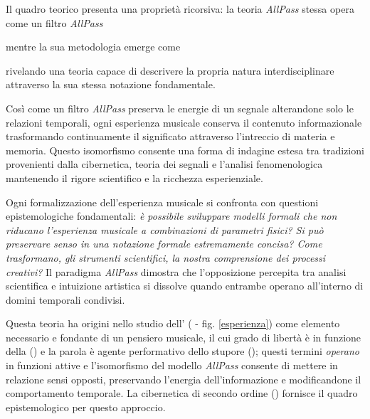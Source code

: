 Il quadro teorico presenta una proprietà ricorsiva: la teoria \emph{AllPass} stessa opera come un filtro \emph{AllPass}


\noindent mentre la sua metodologia emerge come


rivelando una teoria capace di descrivere la propria natura interdisciplinare attraverso la sua stessa notazione fondamentale.

Così come un filtro \emph{AllPass} preserva le energie di un segnale alterandone solo le relazioni temporali, ogni esperienza musicale conserva il contenuto informazionale trasformando continuamente il significato attraverso l'intreccio di materia e memoria. Questo isomorfismo consente una forma di indagine estesa tra tradizioni provenienti dalla cibernetica, teoria dei segnali e l'analisi fenomenologica mantenendo il rigore scientifico e la ricchezza esperienziale.

Ogni formalizzazione dell'esperienza musicale si confronta con questioni epistemologiche fondamentali: \textit{è possibile sviluppare modelli formali che non riducano l'esperienza musicale a combinazioni di parametri fisici? Si può preservare senso in una notazione formale estremamente concisa? Come trasformano, gli strumenti scientifici, la nostra comprensione dei processi creativi?} Il paradigma \emph{AllPass} dimostra che l'opposizione percepita tra analisi scientifica e intuizione artistica si dissolve quando entrambe operano all'interno di domini temporali condivisi.

Questa teoria ha origini nello studio dell' (\cite{bergson1896} - fig. \ref{esperienza}) come elemento necessario e fondante di un pensiero musicale, il cui grado di libertà è in funzione della  (\cite{agamben17}) e la parola è agente performativo dello stupore (\cite{ronchi2001}); questi termini \emph{operano} in funzioni attive e l'isomorfismo del modello \emph{AllPass} consente di mettere in relazione sensi opposti, preservando l'energia dell'informazione e modificandone il comportamento temporale. La cibernetica di secondo ordine (\cite{vonfoerster1981}) fornisce il quadro epistemologico per questo approccio.

